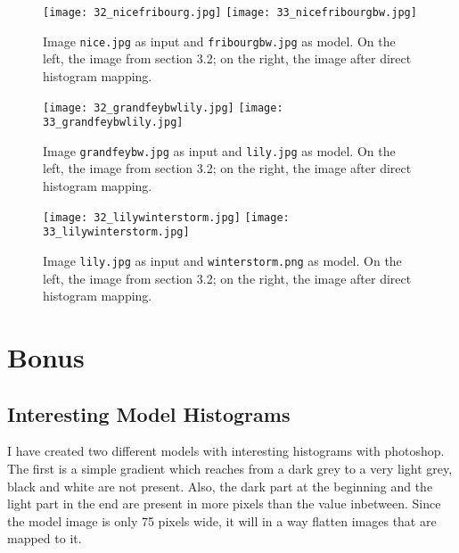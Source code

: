 \documentclass[11pt,a4paper]{article}
\begin{document}
\begin{figure}[htb]
    \begin{center}
    	\texttt{[image: 32\_nicefribourg.jpg]}
    	\texttt{[image: 33\_nicefribourgbw.jpg]}
        \caption{Image \texttt{nice.jpg} as input and \texttt{fribourgbw.jpg} as model. On the left, the image from section 3.2; on the right, the image after direct histogram mapping.\label{img:direct1}}
    \end{center}
\end{figure}

\begin{figure}[htb]
    \begin{center}
    	\texttt{[image: 32\_grandfeybwlily.jpg]}
    	\texttt{[image: 33\_grandfeybwlily.jpg]}
        \caption{Image \texttt{grandfeybw.jpg} as input and \texttt{lily.jpg} as model. On the left, the image from section 3.2; on the right, the image after direct histogram mapping.\label{img:direct2}}
    \end{center}
\end{figure}

\begin{figure}[htb]
    \begin{center}
    	\texttt{[image: 32\_lilywinterstorm.jpg]}
    	\texttt{[image: 33\_lilywinterstorm.jpg]}
        \caption{Image \texttt{lily.jpg} as input and \texttt{winterstorm.png} as model. On the left, the image from section 3.2; on the right, the image after direct histogram mapping.\label{img:direct3}}
    \end{center}
\end{figure}






\newpage
\FloatBarrier
\section{Bonus}
\subsection*{Interesting Model Histograms}

I have created two different models with interesting histograms with photoshop. The first is a simple gradient which reaches from a dark grey to a very light grey, black and white are not present. Also, the dark part at the beginning and the light part in the end are present in more pixels than the value inbetween. Since the model image is only 75 pixels wide, it will in a way flatten images that are mapped to it.
\end{document}
